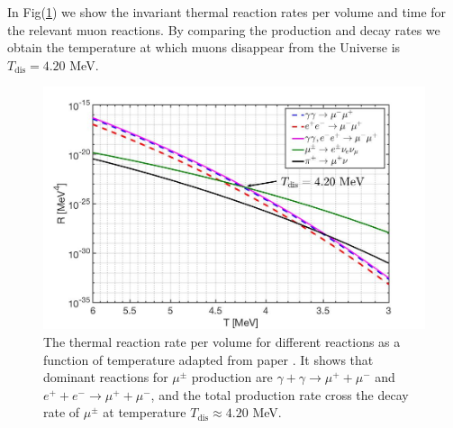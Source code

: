 \documentclass[universe,article,submit,moreauthors,pdftex,a4paper]{Definitions/mdpi}
\begin{document}
In Fig(\ref{muon_fig}) we show the invariant thermal reaction rates per volume and time for the relevant muon reactions. By comparing the production and decay rates we obtain the temperature at which muons disappear from the Universe is $T_\mathrm{dis} = 4.20$ MeV. 
\begin{figure}[t]
\centering
\includegraphics[width=0.9\columnwidth]{MuonRate_new2.jpg}
\caption{The thermal reaction rate per volume for different reactions as a function of temperature adapted from paper \cite{Rafelski:2021aey}. It shows that dominant reactions for $\mu^\pm$ production are ${\gamma+\gamma\to\mu^++\mu^-}$ and $e^++e^-\to\mu^++\mu^-$, and the total production rate cross the decay rate of $\mu^\pm$ at temperature $T_\mathrm{dis}\approx 4.20$ MeV.}
\label{muon_fig} 
\end{figure}
\end{document}
